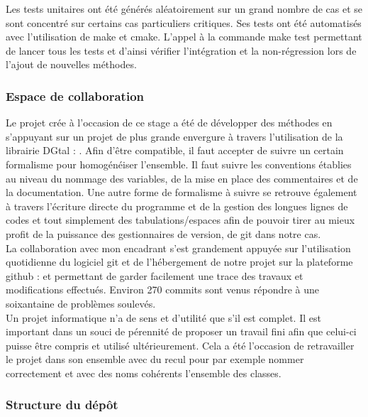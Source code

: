 Les tests unitaires ont été générés aléatoirement sur un grand nombre de cas et se sont concentré sur certains cas particuliers critiques. Ses tests ont été automatisés avec l'utilisation de make et cmake. L'appel à la commande make test permettant de lancer tous les tests et d'ainsi vérifier l'intégration et la non-régression lors de l'ajout de nouvelles méthodes. 


\subsubsection{Espace de collaboration}

Le projet crée à l'occasion de ce stage a été de développer des méthodes en s'appuyant sur un projet de plus grande envergure à travers l'utilisation de la librairie DGtal : \cite{DGtal}. Afin d'être compatible, il faut accepter de suivre un certain formalisme pour homogénéiser l'ensemble. Il faut suivre les conventions établies au niveau du nommage des variables, de la mise en place des commentaires et de la documentation. Une autre forme de formalisme à suivre se retrouve également à travers l'écriture directe du programme et de la gestion des longues lignes de codes et tout simplement des tabulations/espaces afin de pouvoir tirer au mieux profit de la puissance des gestionnaires de version, de git dans notre cas.\\

La collaboration avec mon encadrant s'est grandement appuyée sur l'utilisation quotidienne du logiciel git et de l’hébergement de notre projet sur la plateforme github : \cite{github-tristan} et \cite{github-thomas} permettant de garder facilement une trace des travaux et modifications effectués. Environ 270 commits sont venus répondre à une soixantaine de problèmes soulevés.\\

Un projet informatique n'a de sens et d'utilité que s'il est complet. Il est important dans un souci de pérennité de proposer un travail fini afin que celui-ci puisse être compris et utilisé ultérieurement. Cela a été l’occasion de retravailler le projet dans son ensemble avec du recul pour par exemple nommer correctement et avec des noms cohérents l'ensemble des classes.

\subsubsection{Structure du dépôt}


